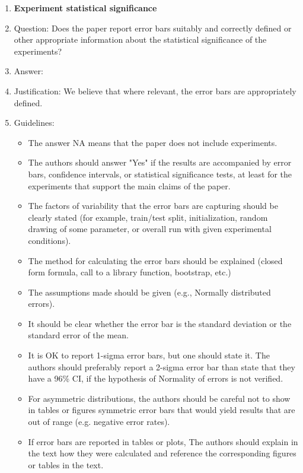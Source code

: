 \documentclass{article}
\begin{document}
\begin{enumerate}
\item {\bf Experiment statistical significance}
    \item[] Question: Does the paper report error bars suitably and correctly defined or other appropriate information about the statistical significance of the experiments?
    \item[] Answer: \answerYes{} %
    \item[] Justification: We believe that where relevant, the error bars are appropriately defined.
    \item[] Guidelines:
    \begin{itemize}
        \item The answer NA means that the paper does not include experiments.
        \item The authors should answer "Yes" if the results are accompanied by error bars, confidence intervals, or statistical significance tests, at least for the experiments that support the main claims of the paper.
        \item The factors of variability that the error bars are capturing should be clearly stated (for example, train/test split, initialization, random drawing of some parameter, or overall run with given experimental conditions).
        \item The method for calculating the error bars should be explained (closed form formula, call to a library function, bootstrap, etc.)
        \item The assumptions made should be given (e.g., Normally distributed errors).
        \item It should be clear whether the error bar is the standard deviation or the standard error of the mean.
        \item It is OK to report 1-sigma error bars, but one should state it. The authors should preferably report a 2-sigma error bar than state that they have a 96\% CI, if the hypothesis of Normality of errors is not verified.
        \item For asymmetric distributions, the authors should be careful not to show in tables or figures symmetric error bars that would yield results that are out of range (e.g. negative error rates).
        \item If error bars are reported in tables or plots, The authors should explain in the text how they were calculated and reference the corresponding figures or tables in the text.
    \end{itemize}


\end{enumerate}
\end{document}

